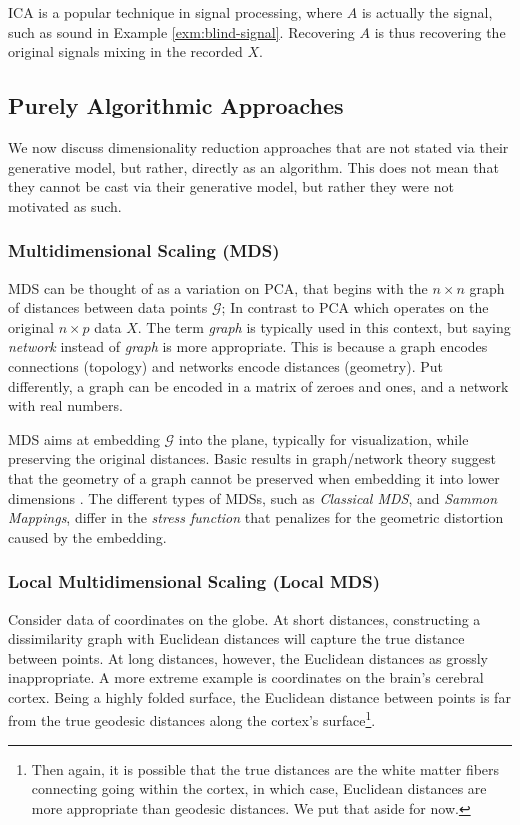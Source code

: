 \documentclass[]{book}
\theoremstyle{definition}
\theoremstyle{definition}
\theoremstyle{definition}
\theoremstyle{remark}
\let\BeginKnitrBlock\begin \let\EndKnitrBlock\end
\begin{document}
ICA is a popular technique in signal processing, where \(A\) is actually
the signal, such as sound in Example \ref{exm:blind-signal}. Recovering
\(A\) is thus recovering the original signals mixing in the recorded
\(X\).

\subsection{Purely Algorithmic
Approaches}\label{purely-algorithmic-approaches}

We now discuss dimensionality reduction approaches that are not stated
via their generative model, but rather, directly as an algorithm. This
does not mean that they cannot be cast via their generative model, but
rather they were not motivated as such.

\subsubsection{Multidimensional Scaling
(MDS)}\label{multidimensional-scaling-mds}

MDS can be thought of as a variation on PCA, that begins with the
\(n \times n\) graph of distances between data points \(\mathcal{G}\);
In contrast to PCA which operates on the original \(n \times p\) data
\(X\). The term \emph{graph} is typically used in this context, but
saying \emph{network} instead of \emph{graph} is more appropriate. This
is because a graph encodes connections (topology) and networks encode
distances (geometry). Put differently, a graph can be encoded in a
matrix of zeroes and ones, and a network with real numbers.

MDS aims at embedding \(\mathcal{G}\) into the plane, typically for
visualization, while preserving the original distances. Basic results in
graph/network theory suggest that the geometry of a graph cannot be
preserved when embedding it into lower dimensions
\citep{graham1988isometric}. The different types of MDSs, such as
\emph{Classical MDS}, and \emph{Sammon Mappings}, differ in the
\emph{stress function} that penalizes for the geometric distortion
caused by the embedding.

\subsubsection{Local Multidimensional Scaling (Local
MDS)}\label{local-multidimensional-scaling-local-mds}

\BeginKnitrBlock{example}
\protect\hypertarget{exm:non-euclidean}{}{\label{exm:non-euclidean}
}Consider data of coordinates on the globe. At short distances,
constructing a dissimilarity graph with Euclidean distances will capture
the true distance between points. At long distances, however, the
Euclidean distances as grossly inappropriate. A more extreme example is
coordinates on the brain's cerebral cortex. Being a highly folded
surface, the Euclidean distance between points is far from the true
geodesic distances along the cortex's surface\footnote{Then again, it is
  possible that the true distances are the white matter fibers
  connecting going within the cortex, in which case, Euclidean distances
  are more appropriate than geodesic distances. We put that aside for
  now.}.
\EndKnitrBlock{example}
\end{document}
